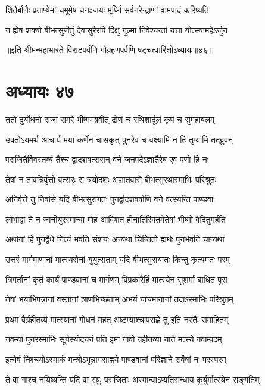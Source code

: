 \twolineshloka
{शितैर्बाणैः प्रताप्येमां चमूमेष धनञ्जयः}
{मूर्ध्नि सर्वनरेन्द्राणां वामपादं करिष्यति}


\twolineshloka
{न ह्येष शक्यो बीभत्सुर्जेतुं देवासुरैरपि}
{दिक्षु गुल्मा निवेश्यन्तां यत्ता योत्स्यामहेऽर्जुन}

॥इति श्रीमन्महाभारते विराटपर्वणि गोग्रहणपर्वणि षट्चत्वारिंशोऽध्यायः॥४६॥

\chapter{अध्यायः ४७}

\twolineshloka
{ततो दुर्योधनो राजा समरे भीष्ममब्रवीत्}
{द्रोणं च रथिशार्दूलं कृपं च सुमहाबलम्}


\twolineshloka
{उक्तोऽयमर्थ आचार्य मया कर्णेन चासकृत्}
{पुनरेव च वक्ष्यामि न हि तृप्यामि तद्ब्रुवन्}


\twolineshloka
{पराजितैर्विवस्तव्यं तैश्च द्वादशवत्सरान्}
{वने जनपदेऽज्ञातैरेष एव पणो हि नः}


\twolineshloka
{तेषां न तावन्निर्वृत्तो वत्सरः स त्रयोदशः}
{अज्ञातवासे बीभत्सुरथास्माभिः परिश्रुतः}


\twolineshloka
{अनिर्वृत्ते तु निर्वासे यदि बीभत्सुरागतः}
{पुनर्द्वादशवर्षाणि वने वत्स्यन्ति पाण्डवाः}


\twolineshloka
{लोभाद्वा ते न जानीयुरस्मान्वा मोह आविशत्}
{हीनातिरिक्तमेतेषां भीष्मो वेदितुमर्हति}


\twolineshloka
{अर्थानां हि पुनर्द्वैधे नित्यं भवति संशयः}
{अन्यथा चिन्तितो ह्यर्थः पुनर्भवति चान्यथा}


\twolineshloka
{उत्तरं मार्गमाणानां मात्स्यसेनां युयुत्सताम्}
{यदि बीभत्सुरायातः किन्तु कृत्यमतः परम्}


\twolineshloka
{त्रिगर्तानां कृतं कार्यं पाण्डवानां च मार्गणम्}
{विप्रकारैर्हि मात्स्येन सुशर्मा बाधित पुरा}


\twolineshloka
{तेषां भयाभिपन्नानां वस्तानां त्राणभिच्छताम्}
{अभयं याचमानानां तदाऽस्माभिः परिश्रुतम्}


\twolineshloka
{प्रथमं वैर्ग्रहीतव्यं मात्स्यानां गोधनं महत्}
{अष्टम्याश्चापराह्णे तु इति नस्तैः समाहितम्}


\twolineshloka
{नवम्यां पुनरस्माभिः सूर्यस्योदयनं प्रति}
{इमा गावो ग्रहीतव्या याते मत्स्ये गवाम्पदम्}


\twolineshloka
{इत्येवं निश्चयोऽस्माकं मन्त्रोऽभून्नागसाह्वये}
{पाण्डवानां परिज्ञाने सर्वेषां नः परस्परम्}


\twolineshloka
{ते वा गाश्च नयिष्यन्ति यदि वा स्युः पराजिताः}
{अस्मान्वाऽप्यतिसन्धाय कुर्युर्मात्स्येन सङ्गतिम्}


